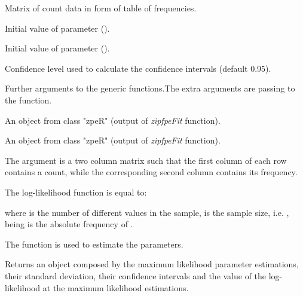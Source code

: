 \documentclass[letterpaper]{book}
\begin{document}
\begin{Arguments}
\begin{ldescription}
\item[\code{data}] Matrix of count data in form of table of frequencies.

\item[\code{init\_alpha}] Initial value of \eqn{\alpha}{} parameter ().

\item[\code{init\_beta}] Initial value of \eqn{\beta}{} parameter (\eqn{\beta \in (-\infty, +\infty)}{}).

\item[\code{level}] Confidence level used to calculate the confidence intervals (default 0.95).

\item[\code{...}] Further arguments to the generic functions.The extra arguments are passing
to the \emph{} function.

\item[\code{object}] An object from class "zpeR" (output of \emph{zipfpeFit} function).

\item[\code{x}] An object from class "zpeR" (output of \emph{zipfpeFit} function).
\end{ldescription}
\end{Arguments}
%
\begin{Details}\relax
The argument  is a two column matrix such that the first column of each row contains a
count, while the corresponding second column contains its frequency.

The log-likelihood function is equal to:

where  is the number of different values in the sample,  is the sample size,
i.e.  ,  being  is the absolute
frequency of .

The function \emph{} is used to estimate the parameters.
\end{Details}
%
\begin{Value}
Returns an object composed by the maximum likelihood parameter estimations, their standard deviation, their confidence
intervals and the value of the log-likelihood at the maximum likelihood estimations.
\end{Value}
\end{document}
